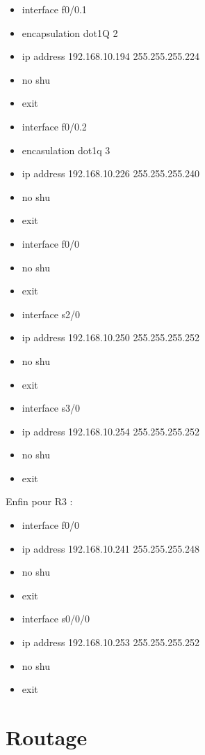 \documentclass[a4paper,10pt,final,fleqn]{article}
\begin{document}
	\begin{itemize}
		\item interface f0/0.1
		\item encapsulation dot1Q 2
		\item ip address 192.168.10.194 255.255.255.224
		\item no shu
		\item exit
		\item interface f0/0.2
		\item encasulation dot1q 3
		\item ip address 192.168.10.226 255.255.255.240
		\item no shu
		\item exit
		\item interface f0/0
		\item no shu
		\item exit\\
		\item interface s2/0
		\item ip address 192.168.10.250 255.255.255.252
		\item no shu
		\item exit\\
		\item interface s3/0
		\item ip address 192.168.10.254 255.255.255.252
		\item no shu
		\item exit\\
	\end{itemize}

	Enfin pour R3 : \\

	\begin{itemize}
		\item interface f0/0
		\item ip address 192.168.10.241 255.255.255.248
		\item no shu
		\item exit
		\item interface s0/0/0
		\item ip address 192.168.10.253 255.255.255.252
		\item no shu
		\item exit\\
	\end{itemize}


\section{Routage}
	
\end{document}

